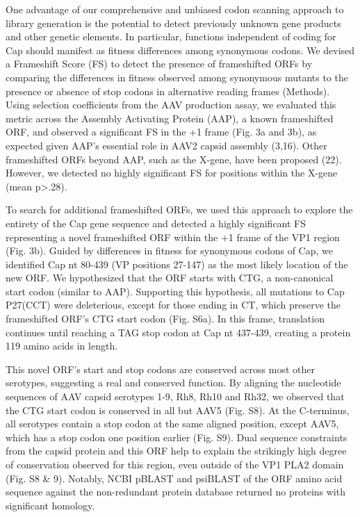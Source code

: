 One advantage of our comprehensive and unbiased codon scanning approach to library generation is the potential to detect previously unknown gene products and other genetic elements. In particular, functions independent of coding for Cap should manifest as fitness differences among synonymous codons. We devised a Frameshift Score (FS) to detect the presence of frameshifted ORFs by comparing the differences in fitness observed among synonymous mutants to the presence or absence of stop codons in alternative reading frames (Methods). Using selection coefficients from the AAV production assay, we evaluated this metric across the Assembly Activating Protein (AAP), a known frameshifted ORF, and observed a significant FS in the +1 frame (Fig. 3a and 3b), as expected given AAP’s essential role in AAV2 capsid assembly (3,16). Other frameshifted ORFs beyond AAP, such as the X-gene, have been proposed (22). However, we detected no highly significant FS for positions within the X-gene (mean p>.28).

To search for additional frameshifted ORFs, we used this approach to explore the entirety of the Cap gene sequence and detected a highly significant FS representing a novel frameshifted ORF within the +1 frame of the VP1 region (Fig. 3b). Guided by differences in fitness for synonymous codons of Cap, we identified Cap nt 80-439 (VP positions 27-147) as the most likely location of the new ORF. We hypothesized that the ORF starts with CTG, a non-canonical start codon (similar to AAP). Supporting this hypothesis, all mutations to Cap P27(CCT) were deleterious, except for those ending in CT, which preserve the frameshifted ORF’s CTG start codon (Fig. S6a). In this frame, translation continues until reaching a TAG stop codon at Cap nt 437-439, creating a protein 119 amino acids in length. 

This novel ORF’s start and stop codons are conserved across most other serotypes, suggesting a real and conserved function. By aligning the nucleotide sequences of AAV capsid serotypes 1-9, Rh8, Rh10 and Rh32, we observed that the CTG start codon is conserved in all but AAV5 (Fig. S8). At the C-terminus, all serotypes contain a stop codon at the same aligned position, except AAV5, which has a stop codon one position earlier (Fig. S9). Dual sequence constraints from the capsid protein and this ORF help to explain the strikingly high degree of conservation observed for this region, even outside of the VP1 PLA2 domain (Fig. S8 \& 9). Notably, NCBI pBLAST and psiBLAST of the ORF amino acid sequence against the non-redundant protein database returned no proteins with significant homology.


